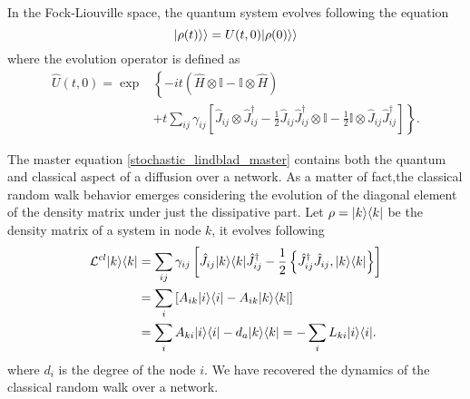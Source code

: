 In the Fock-Liouville space, the quantum system evolves following the equation
\begin{equation}
    \lvert\rho(t)\rangle\rangle  = U(t,0) \lvert\rho(0)\rangle\rangle
\end{equation} 
where the evolution operator is defined as \cite{Domino}
\begin{equation}
    \begin{split}
        \hat U(t,0) = \exp&\left\{-it\left(\hat H\otimes\mathbb{I}-\mathbb{I}\otimes\hat H\right)\right.\\
        &+\left. t\sum_{ij}\gamma_{ij}\left[ \hat J_{ij}\otimes\hat J^\dagger_{ij}-\frac{1}{2}\hat J_{ij}\hat J^\dagger_{ij}\otimes\mathbb{I}-\frac{1}{2}\mathbb{I}\otimes\hat J_{ij}\hat J^\dagger_{ij}\right]\right\}.
    \end{split}
\end{equation}



The master equation \eqref{stochastic_lindblad_master} contains both the quantum and classical aspect of a diffusion over a network. As a matter of fact,the classical random walk behavior emerges considering the evolution of the diagonal element of the density matrix under just the dissipative part. Let $\rho = \lvert k\rangle\langle k\rvert$ be the density matrix of a system in node $k$, it evolves following
\begin{equation}
    \begin{split}
        \mathcal{L}^{cl}\lvert k\rangle\langle k\rvert &= \sum_{ij}\gamma_{ij}\left[\hat J_{ij} \lvert k\rangle\langle k\rvert\hat J_{ij}^\dagger -\frac{1}{2} \left\{ \hat J_{ij}^\dagger \hat J_{ij}, \lvert k\rangle\langle k\rvert\right\}\right]\\
        &= \sum_{i}\left[A_{ik} \lvert i\rangle\langle i\rvert -A_{ik}\lvert k\rangle\langle k\rvert\right]\\
        &=\sum_{i} A_{ki} \lvert i\rangle\langle i\rvert - d_a \lvert k\rangle\langle k\rvert = -\sum_i L_{ki} \lvert i\rangle\langle i\rvert.
    \end{split}
\end{equation} 
where $d_i$ is the degree of the node $i$.
We have recovered the dynamics of the classical random walk over a network.

